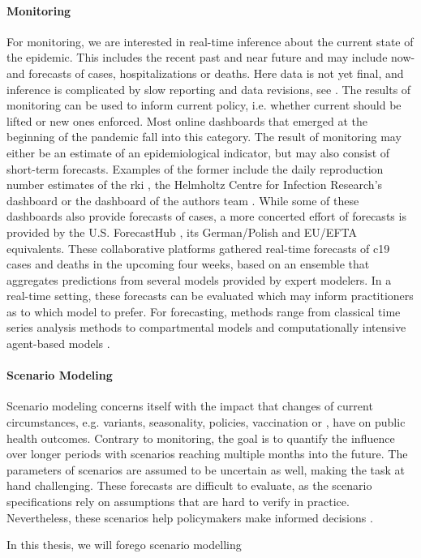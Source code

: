 \paragraph{Monitoring}
For monitoring, we are interested in real-time inference about the current state of the epidemic. This includes the recent past and near future and may include now- and forecasts of cases, hospitalizations or deaths. Here data is not yet final, and inference is complicated by slow reporting and data revisions, see . The results of monitoring can be used to inform current policy, i.e. whether current  should be lifted or new ones enforced. Most online dashboards that emerged at the beginning of the pandemic fall into this category. The result of monitoring may either be an estimate of an epidemiological indicator, but may also consist of short-term forecasts. Examples of the former include the daily reproduction number estimates of the \acrshort{rki} \cite{AnDerHeiden2020Schatzung}, the Helmholtz Centre for Infection Research's dashboard \cite{Khailaie2021Development} or the dashboard of the authors team \cite{Hotz2020Monitoring}.
While some of these dashboards also provide forecasts of cases, a more concerted effort of forecasts is provided by the U.S. ForecastHub \cite{Ray2020Ensemble}, its German/Polish \cite{Bracher2021Preregistered,Bracher2022National} and EU/EFTA \cite{Sherratt2022Predictive} equivalents. These collaborative platforms gathered real-time forecasts of \acrshort{c19} cases and deaths in the upcoming four weeks, based on an ensemble that aggregates predictions from several models provided by expert modelers. In a real-time setting, these forecasts can be evaluated which may inform practitioners as to which model to prefer. 
For forecasting, methods range from classical time series analysis methods \cite{Arroyo-Marioli2021Tracking} to compartmental models \cite{Khailaie2021Development} and computationally intensive agent-based models \cite{Adamik2020Mitigation}.

\paragraph{Scenario Modeling}
Scenario modeling concerns itself with the impact that changes of current circumstances, e.g. variants, seasonality, policies, vaccination or , have on public health outcomes. Contrary to monitoring, the goal is to quantify the influence over longer periods with scenarios reaching multiple months into the future. The parameters of scenarios are assumed to be uncertain as well, making the task at hand challenging. These forecasts are difficult to evaluate, as the scenario specifications rely on assumptions that are hard to verify in practice. Nevertheless, these scenarios help policymakers make informed decisions \cite{Borchering2023Public}.

In this thesis, we will forego scenario modelling